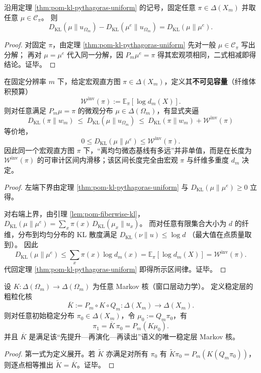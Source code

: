 \begin{corollary}\label{cor:pom-Iproj-gap-exact}
沿用定理 \ref{thm:pom-kl-pythagoras-uniform} 的记号，固定任意 $\pi\in\Delta(X_m)$ 并取任意 $\mu\in\mathcal{C}_\pi$。
则
\[
\boxed{\;
D_{\mathrm{KL}}(\mu\|u_{\Omega_m})-D_{\mathrm{KL}}(\mu^e\|u_{\Omega_m})
=D_{\mathrm{KL}}(\mu\|\mu^e).
\;}
\]
\end{corollary}
\begin{proof}
对固定 $\pi$，由定理 \ref{thm:pom-kl-pythagoras-uniform} 先对一般 $\mu\in\mathcal{C}_\pi$ 写出分解；
再对 $\mu=\mu^e$ 代入同一分解，因 $P_m\mu^e=\pi$ 得其宏观项相同，二式相减即得结论。证毕。
\end{proof}

\begin{corollary}\label{cor:pom-micro-slip-window}
在固定分辨率 $m$ 下，给定宏观直方图 $\pi\in\Delta(X_m)$，定义其\textbf{不可见容量}（纤维体积预算）
\[
\mathcal{W}^{\mathrm{inv}}(\pi):=\mathbb{E}_\pi[\log d_m(X)].
\]
则对任意满足 $P_m\mu=\pi$ 的微观分布 $\mu\in\Delta(\Omega_m)$，有显式夹逼
\[
\boxed{\;
D_{\mathrm{KL}}(\pi\|w_m)\ \le\ D_{\mathrm{KL}}(\mu\|u_{\Omega_m})\ \le\ D_{\mathrm{KL}}(\pi\|w_m)+\mathcal{W}^{\mathrm{inv}}(\pi)
\;}
\]
等价地，
\[
0\le D_{\mathrm{KL}}(\mu\|\mu^e)\le \mathcal{W}^{\mathrm{inv}}(\pi).
\]
因此同一个宏观直方图 $\pi$ 下，“离均匀微态基线有多远”并非单值，而是在长度为 $\mathcal{W}^{\mathrm{inv}}(\pi)$ 的可审计区间内滑移；该区间长度完全由宏观 $\pi$ 与纤维多重度 $d_m$ 决定。
\end{corollary}
\begin{proof}
左端下界由定理 \ref{thm:pom-kl-pythagoras-uniform} 与 $D_{\mathrm{KL}}(\mu\|\mu^e)\ge 0$ 立得。
\par
对右端上界，由引理 \ref{lem:pom-fiberwise-kl}，
\(
D_{\mathrm{KL}}(\mu\|\mu^e)=\sum_x \pi(x)\,D_{\mathrm{KL}}(\mu_x\|u_x)
\)。
而对任意有限集合大小为 $d$ 的纤维，分布到均匀分布的 KL 散度满足
\(
D_{\mathrm{KL}}(\nu\|u)\le \log d
\)
（最大值在点质量取到）。
因此
\[
D_{\mathrm{KL}}(\mu\|\mu^e)\le \sum_x \pi(x)\log d_m(x)=\mathbb{E}_\pi[\log d_m(X)]=\mathcal{W}^{\mathrm{inv}}(\pi).
\]
代回定理 \ref{thm:pom-kl-pythagoras-uniform} 即得所示区间律。证毕。
\end{proof}

\begin{theorem}\label{thm:pom-coarse-grained-kernel}
设 $K:\Delta(\Omega_m)\to\Delta(\Omega_m)$ 为任意 Markov 核（窗口层动力学）。
定义稳定层的粗粒化核
\[
\overline K:=P_m\circ K\circ Q_m:\Delta(X_m)\to\Delta(X_m).
\]
则对任意初始稳定分布 $\pi_0\in\Delta(X_m)$，令 $\mu_0:=Q_m\pi_0$，有
\[
\pi_1=\overline K\,\pi_0=P_m(K\mu_0).
\]
并且 $\overline K$ 是满足该“先提升—再演化—再读出”语义的唯一稳定层 Markov 核。
\end{theorem}
\begin{proof}
第一式为定义展开。若 $\widetilde K$ 亦满足对所有 $\pi_0$ 有
\(
\widetilde K\pi_0=P_m(K(Q_m\pi_0))
\)，
则逐点相等推出 $\widetilde K=\overline K$。证毕。
\end{proof}

